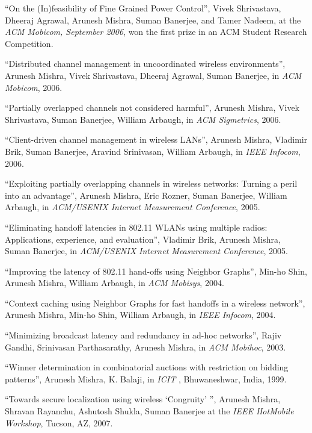 \begin{resume}
\mybullet ``On the (In)feasibility of Fine Grained Power Control'', Vivek Shrivastava, Dheeraj Agrawal, Arunesh Mishra, Suman Banerjee, and Tamer Nadeem,
at the {\it ACM Mobicom,  September 2006}, won the first prize in an {ACM Student Research Competition}.

\mybullet ``Distributed channel management in uncoordinated wireless environments'', Arunesh Mishra, Vivek Shrivastava,
Dheeraj Agrawal, Suman Banerjee, in {\em ACM Mobicom}, 2006.

\mybullet ``Partially overlapped channels not considered harmful'', Arunesh Mishra, Vivek Shrivastava, Suman Banerjee, William
Arbaugh, in {\em ACM Sigmetrics}, 2006.

\mybullet ``Client-driven channel management in wireless LANs'', Arunesh Mishra, Vladimir Brik, Suman Banerjee, Aravind
Srinivasan, William Arbaugh, in {\em IEEE Infocom}, 2006.

\mybullet ``Exploiting partially overlapping channels in wireless networks: Turning a peril into an advantage'',
Arunesh Mishra, Eric Rozner, Suman Banerjee, William Arbaugh, in  {\em  ACM/USENIX Internet Measurement Conference}, 2005.

\mybullet ``Eliminating handoff latencies in 802.11 WLANs using multiple radios: Applications, experience, and evaluation'', 
Vladimir Brik, Arunesh Mishra, Suman Banerjee, in {\em ACM/USENIX Internet Measurement Conference}, 2005.

\mybullet ``Improving the latency of 802.11 hand-offs using Neighbor Graphs'',
Min-ho Shin, Arunesh Mishra, William Arbaugh, in {\em ACM Mobisys},  2004.

\mybullet ``Context caching using Neighbor Graphs for fast handoffs in a wireless network'', Arunesh Mishra, 
Min-ho Shin, William Arbaugh, in {\em  IEEE Infocom}, 2004.

\mybullet ``Minimizing broadcast latency and redundancy in ad-hoc networks'', Rajiv Gandhi, Srinivasan Parthasarathy, 
Arunesh Mishra, in {\em ACM Mobihoc}, 2003.

\mybullet ``Winner determination in combinatorial auctions with restriction on bidding patterns'', Arunesh Mishra, 
K. Balaji, in {\em ICIT }, Bhuwaneshwar, India, 1999.

\vspace{-0.7cm}

\mybullet ``Towards secure localization using wireless `Congruity' '', Arunesh Mishra, Shravan Rayanchu, Ashutosh Shukla, Suman Banerjee
at the {\it IEEE HotMobile Workshop}, Tucson, AZ, 2007.


\end{resume}
